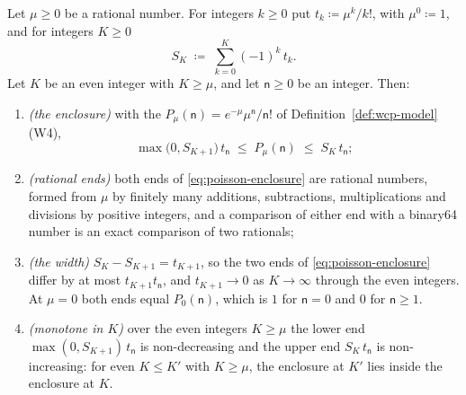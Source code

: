 \begin{lemma}\label{lem:poisson-enclosure}
Let $\mu\ge0$ be a rational number. For integers $k\ge0$ put
$t_k\coloneqq\mu^k/k!$, with $\mu^0\coloneqq1$, and for integers $K\ge0$
\begin{equation}\label{eq:expsum}
  S_K\;\coloneqq\;\sum_{k=0}^{K}(-1)^k\,t_k .
\end{equation}
Let $K$ be an even integer with $K\ge\mu$, and let $\mathsf{n}\ge0$ be an
integer. Then:
\begin{enumerate}[label=(\roman*),leftmargin=2.2em]
\item \emph{(the enclosure)} with the 
$P_\mu(\mathsf{n})=e^{-\mu}\mu^{\mathsf{n}}/\mathsf{n}!$ of
Definition~\ref{def:wcp-model}\,(W4),
\begin{equation}\label{eq:poisson-enclosure}
  \max\big(0,S_{K+1}\big)\,t_{\mathsf{n}}
  \;\le\;P_\mu(\mathsf{n})\;\le\;S_K\,t_{\mathsf{n}} ;
\end{equation}
\item \emph{(rational ends)} both ends of \eqref{eq:poisson-enclosure} are
rational numbers, formed from $\mu$ by finitely many additions, subtractions,
multiplications and divisions by positive integers, and a comparison of
either end with a binary64 number is an exact comparison of two rationals;
\item \emph{(the width)} $S_K-S_{K+1}=t_{K+1}$, so the two ends of
\eqref{eq:poisson-enclosure} differ by at most $t_{K+1}t_{\mathsf{n}}$, and
$t_{K+1}\to0$ as $K\to\infty$ through the even integers. At $\mu=0$ both ends
equal $P_0(\mathsf{n})$, which is $1$ for $\mathsf{n}=0$ and $0$ for
$\mathsf{n}\ge1$.
\item \emph{(monotone in $K$)} over the even integers $K\ge\mu$ the lower end
$\max(0,S_{K+1})\,t_{\mathsf{n}}$ is non-decreasing and the upper end
$S_K\,t_{\mathsf{n}}$ is non-increasing: for even $K\le K'$ with $K\ge\mu$,
the enclosure at $K'$ lies inside the enclosure at $K$.
\end{enumerate}
\end{lemma}

